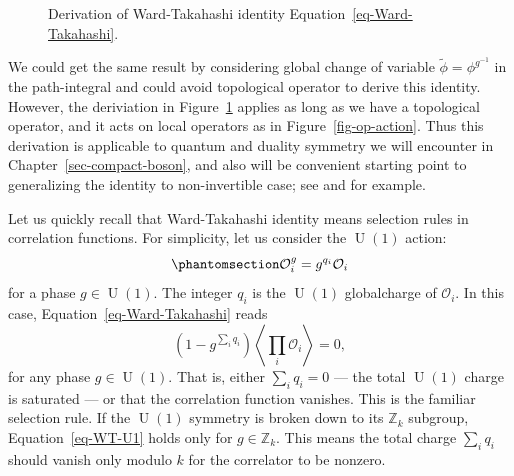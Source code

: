 \documentclass[
  letterpaper,
  DIV=11,
  numbers=noendperiod]{scrreport}
\DeclareMathOperator{\U}{U}
\begin{document}
\begin{figure}[t]


\caption{\label{fig-Ward-Takahashi}Derivation of Ward-Takahashi identity
Equation~\ref{eq-Ward-Takahashi}.}

\end{figure}%

We could get the same result by considering global change of variable
\(\widetilde{\phi} = \phi^{g^{-1}}\) in the path-integral and could
avoid topological operator to derive this identity. However, the
deriviation in Figure~\ref{fig-Ward-Takahashi} applies as long as we
have a topological operator, and it acts on local operators as in
Figure~\ref{fig-op-action}. Thus this derivation is applicable to
quantum and duality symmetry we will encounter in
Chapter~\ref{sec-compact-boson}, and also will be convenient starting
point to generalizing the identity to non-invertible case; see
\textcite{Cordova:2022ieu} and \textcite{Copetti:2023mcq} for example.

Let us quickly recall that Ward-Takahashi identity means selection rules
in correlation functions. For simplicity, let us consider the \(\U(1)\)
action: \begin{equation}\phantomsection\label{eq-WT-U1}{
\mathcal{O}_i^g = g^{q_i}\mathcal{O}_i
}\end{equation} for a phase \(g \in \U(1)\). The integer \(q_i\) is the
\(\U(1)\) globalcharge of \(\mathcal{O}_i\). In this case,
Equation~\ref{eq-Ward-Takahashi} reads \[ 
\left(1-g^{\sum_i q_i}\right)\left\langle \prod_i \mathcal{O}_i\right\rangle = 0,
\] for any phase \(g \in \U(1)\). That is, either \(\sum_i q_i =0\) ---
the total \(\U(1)\) charge is saturated --- or that the correlation
function vanishes. This is the familiar selection rule. If the \(\U(1)\)
symmetry is broken down to its \(\mathbb{Z}_k\) subgroup,
Equation~\ref{eq-WT-U1} holds only for \(g\in \mathbb{Z}_k\). This means
the total charge \(\sum_i q_i\) should vanish only modulo \(k\) for the
correlator to be nonzero.
\end{document}
